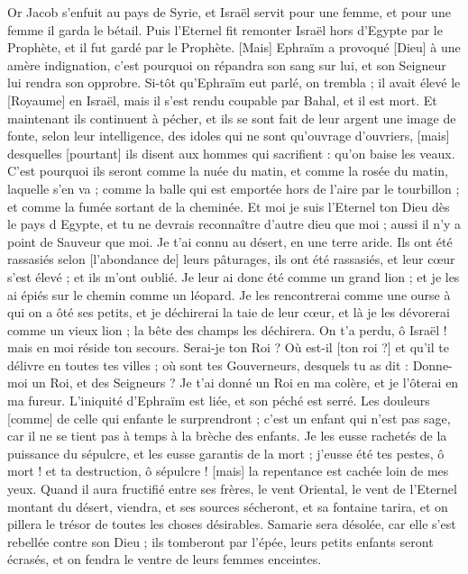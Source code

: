 \begin{multicols}{2}
Or Jacob s'enfuit au pays de Syrie, et Israël servit pour une femme, et pour une femme il garda le bétail.
Puis l'Eternel fit remonter Israël hors d'Egypte par le Prophète, et il fut gardé par le Prophète.
[Mais] Ephraïm a provoqué [Dieu] à une amère indignation, c'est pourquoi on répandra son sang sur lui, et son Seigneur lui rendra son opprobre.
\VerseOne{}Si-tôt qu'Ephraïm eut parlé, on trembla ; il avait élevé le [Royaume] en Israël, mais il s'est rendu coupable par Bahal, et il est mort.
Et maintenant ils continuent à pécher, et ils se sont fait de leur argent une image de fonte, selon leur intelligence, des idoles qui ne sont qu'ouvrage d'ouvriers, [mais] desquelles [pourtant] ils disent aux hommes qui sacrifient : qu'on baise les veaux.
C'est pourquoi ils seront comme la nuée du matin, et comme la rosée du matin, laquelle s'en va ; comme la balle qui est emportée hors de l'aire par le tourbillon ; et comme la fumée sortant de la cheminée.
Et moi je suis l'Eternel ton Dieu dès le pays d Egypte, et tu ne devrais reconnaître d'autre dieu que moi ; aussi il n'y a point de Sauveur que moi.
Je t'ai connu au désert, en une terre aride.
Ils ont été rassasiés selon [l'abondance de] leurs pâturages, ils ont été rassasiés, et leur cœur s'est élevé ; et ils m'ont oublié.
Je leur ai donc été comme un grand lion ; et je les ai épiés sur le chemin comme un léopard.
Je les rencontrerai comme une ourse à qui on a ôté ses petits, et je déchirerai la taie de leur cœur, et là je les dévorerai comme un vieux lion ; la bête des champs les déchirera.
On t'a perdu, ô Israël ! mais en moi réside ton secours.
Serai-je ton Roi ? Où est-il [ton roi ?] et qu'il te délivre en toutes tes villes ; où sont tes Gouverneurs, desquels tu as dit : Donne-moi un Roi, et des Seigneurs ?
Je t'ai donné un Roi en ma colère, et je l'ôterai en ma fureur.
L'iniquité d'Ephraïm est liée, et son péché est serré.
Les douleurs [comme] de celle qui enfante le surprendront ; c'est un enfant qui n'est pas sage, car il ne se tient pas à temps à la brèche des enfants.
Je les eusse rachetés de la puissance du sépulcre, et les eusse garantis de la mort ; j'eusse été tes pestes, ô mort ! et ta destruction, ô sépulcre ! [mais] la repentance est cachée loin de mes yeux.
Quand il aura fructifié entre ses frères, le vent Oriental, le vent de l'Eternel montant du désert, viendra, et ses sources sécheront, et sa fontaine tarira, et on pillera le trésor de toutes les choses désirables.
Samarie sera désolée, car elle s'est rebellée contre son Dieu ; ils tomberont par l'épée, leurs petits enfants seront écrasés, et on fendra le ventre de leurs femmes enceintes.

\end{multicols}
